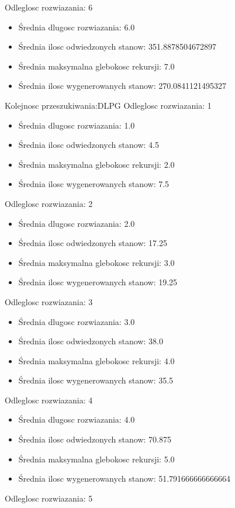 \documentclass{classrep}
\begin{document}
		Odleglosc rozwiazania: 6
		\begin{itemize}
			\item Średnia dlugosc rozwiazania: 6.0
			\item Średnia ilosc odwiedzonych stanow: 351.8878504672897
			\item Średnia maksymalna glebokosc rekursji: 7.0
			\item Średnia ilosc wygenerowanych stanow: 270.0841121495327
		\end{itemize}
		
		Kolejnosc przeszukiwania:DLPG
		Odleglosc rozwiazania: 1
		\begin{itemize}
			\item Średnia dlugosc rozwiazania: 1.0
			\item Średnia ilosc odwiedzonych stanow: 4.5
			\item Średnia maksymalna glebokosc rekursji: 2.0
			\item Średnia ilosc wygenerowanych stanow: 7.5
		\end{itemize}
		Odleglosc rozwiazania: 2
		\begin{itemize}
			\item Średnia dlugosc rozwiazania: 2.0
			\item Średnia ilosc odwiedzonych stanow: 17.25
			\item Średnia maksymalna glebokosc rekursji: 3.0
			\item Średnia ilosc wygenerowanych stanow: 19.25
		\end{itemize}
		Odleglosc rozwiazania: 3
		\begin{itemize}
			\item Średnia dlugosc rozwiazania: 3.0
			\item Średnia ilosc odwiedzonych stanow: 38.0
			\item Średnia maksymalna glebokosc rekursji: 4.0
			\item Średnia ilosc wygenerowanych stanow: 35.5
		\end{itemize}
		Odleglosc rozwiazania: 4
		\begin{itemize}
			\item Średnia dlugosc rozwiazania: 4.0
			\item Średnia ilosc odwiedzonych stanow: 70.875
			\item Średnia maksymalna glebokosc rekursji: 5.0
			\item Średnia ilosc wygenerowanych stanow: 51.791666666666664
		\end{itemize}
		Odleglosc rozwiazania: 5
\end{document}
